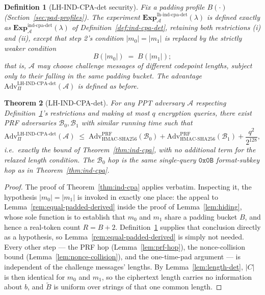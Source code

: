 \documentclass[11pt,a4paper]{article}
\newtheorem{theorem}{Theorem}[section]
\newtheorem{definition}[theorem]{Definition}
\begin{document}
\begin{definition}[LH-IND-CPA-det security]\label{def:lh-ind-cpa-det}
Fix a padding profile $B(\cdot)$ (Section~\ref{sec:pad-profiles}). The
experiment
$\mathbf{Exp}^{\mathrm{lh\text{-}ind\text{-}cpa\text{-}det}}_{\mathcal{A}}(\lambda)$
is defined exactly as
$\mathbf{Exp}^{\mathrm{ind\text{-}cpa\text{-}det}}_{\mathcal{A}}(\lambda)$
of Definition~\ref{def:ind-cpa-det}, retaining both restrictions (i) and
(ii), except that step 2's condition $|m_0|=|m_1|$ is replaced by the
strictly weaker condition
\[
  B(|m_0|) \;=\; B(|m_1|);
\]
that is, $\mathcal{A}$ may choose challenge messages of \emph{different}
codepoint lengths, subject only to their falling in the same padding
bucket. The advantage
$\mathrm{Adv}^{\mathrm{LH\text{-}IND\text{-}CPA\text{-}det}}_{\Pi}(\mathcal{A})$
is defined as before.
\end{definition}

\begin{theorem}[LH-IND-CPA-det]\label{thm:lh-ind-cpa}
For any PPT adversary $\mathcal{A}$ respecting
Definition~\ref{def:lh-ind-cpa-det}'s restrictions and making at most $q$
encryption queries, there exist PRF adversaries
$\mathcal{B}_0,\mathcal{B}_1$ with similar running time such that
\[
  \mathrm{Adv}^{\mathrm{LH\text{-}IND\text{-}CPA\text{-}det}}_{\Pi}(\mathcal{A})
  \;\leq\;
  \mathrm{Adv}^{\mathrm{PRF}}_{\mathrm{HMAC\text{-}SHA256}}(\mathcal{B}_0)
  + \mathrm{Adv}^{\mathrm{PRF}}_{\mathrm{HMAC\text{-}SHA256}}(\mathcal{B}_1)
  + \frac{q^2}{2^{128}},
\]
i.e.\ exactly the bound of Theorem~\ref{thm:ind-cpa}, with no additional
term for the relaxed length condition. The $\mathcal{B}_0$ hop is the
same single-query $\texttt{0x0B}$ format-subkey hop as in
Theorem~\ref{thm:ind-cpa}.
\end{theorem}

\begin{proof}
The proof of Theorem~\ref{thm:ind-cpa} applies verbatim. Inspecting it, the
hypothesis $|m_0|=|m_1|$ is invoked in exactly one place: the appeal to
Lemma~\ref{rem:equal-padded-derived} inside the proof of
Lemma~\ref{lem:hiding}, whose sole function is to establish that $m_0$ and
$m_1$ share a padding bucket $B$, and hence a real-token count $R=B+2$.
Definition~\ref{def:lh-ind-cpa-det} supplies that conclusion directly as a
hypothesis, so Lemma~\ref{rem:equal-padded-derived} is simply not needed.
Every other step — the PRF hop (Lemma~\ref{lem:prf-hop}), the
nonce-collision bound (Lemma~\ref{lem:nonce-collision}), and the
one-time-pad argument — is independent of the challenge messages' lengths.
By Lemma~\ref{lem:length-det}, $|C|$ is then identical for $m_0$ and $m_1$,
so the ciphertext length carries no information about $b$, and
$\widetilde{B}$ is uniform over strings of that one common length.
\end{proof}
\end{document}
